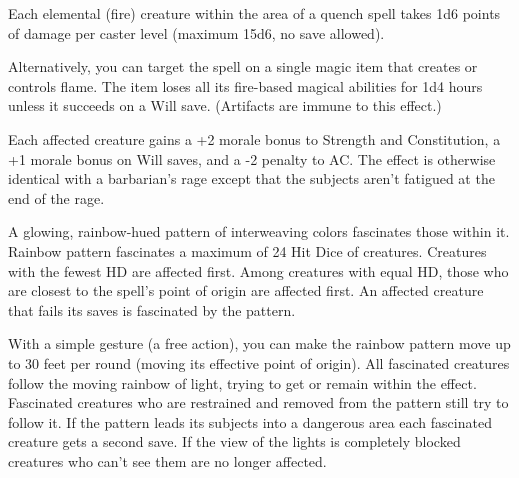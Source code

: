 \begin{multicols}{2}
\begin{small}
\smallskip\noindent Each elemental (fire) creature within the area of a quench spell takes 1d6 points of damage per caster level (maximum 15d6, no save allowed).

\smallskip\noindent Alternatively, you can target the spell on a single magic item that creates or controls flame. The item loses all its fire-based magical abilities for 1d4 hours unless it succeeds on a Will save. (Artifacts are immune to this effect.)

\noindent Each affected creature gains a +2 morale bonus to Strength and Constitution, a +1 morale bonus on Will saves, and a -2 penalty to AC. The effect is otherwise identical with a barbarian's rage except that the subjects aren't fatigued at the end of the rage.

\noindent A glowing, rainbow-hued pattern of interweaving colors fascinates those within it. Rainbow pattern fascinates a maximum of 24 Hit Dice of creatures. Creatures with the fewest HD are affected first. Among creatures with equal HD, those who are closest to the spell's point of origin are affected first. An affected creature that fails its saves is fascinated by the pattern.

\smallskip\noindent With a simple gesture (a free action), you can make the rainbow pattern move up to 30 feet per round (moving its effective point of origin). All fascinated creatures follow the moving rainbow of light, trying to get or remain within the effect. Fascinated creatures who are restrained and removed from the pattern still try to follow it. If the pattern leads its subjects into a dangerous area each fascinated creature gets a second save. If the view of the lights is completely blocked creatures who can't see them are no longer affected.


\end{small}
\end{multicols}
